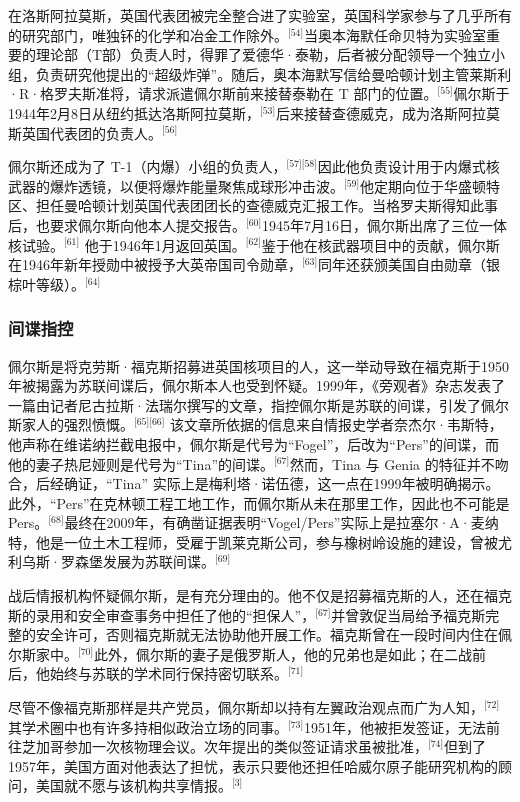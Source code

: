 在洛斯阿拉莫斯，英国代表团被完全整合进了实验室，英国科学家参与了几乎所有的研究部门，唯独钚的化学和冶金工作除外。\(^\text{[54]}\)当奥本海默任命贝特为实验室重要的理论部（T部）负责人时，得罪了爱德华·泰勒，后者被分配领导一个独立小组，负责研究他提出的“超级炸弹”。随后，奥本海默写信给曼哈顿计划主管莱斯利·R·格罗夫斯准将，请求派遣佩尔斯前来接替泰勒在 T 部门的位置。\(^\text{[55]}\)佩尔斯于1944年2月8日从纽约抵达洛斯阿拉莫斯，\(^\text{[53]}\)后来接替查德威克，成为洛斯阿拉莫斯英国代表团的负责人。\(^\text{[56]}\)

佩尔斯还成为了 T-1（内爆）小组的负责人，\(^\text{[57][58]}\)因此他负责设计用于内爆式核武器的爆炸透镜，以便将爆炸能量聚焦成球形冲击波。\(^\text{[59]}\)他定期向位于华盛顿特区、担任曼哈顿计划英国代表团团长的查德威克汇报工作。当格罗夫斯得知此事后，也要求佩尔斯向他本人提交报告。\(^\text{[60]}\)1945年7月16日，佩尔斯出席了三位一体核试验。\(^\text{[61]}\) 他于1946年1月返回英国。\(^\text{[62]}\)鉴于他在核武器项目中的贡献，佩尔斯在1946年新年授勋中被授予大英帝国司令勋章，\(^\text{[63]}\)同年还获颁美国自由勋章（银棕叶等级）。\(^\text{[64]}\)
\subsubsection{间谍指控}
佩尔斯是将克劳斯·福克斯招募进英国核项目的人，这一举动导致在福克斯于1950年被揭露为苏联间谍后，佩尔斯本人也受到怀疑。1999年，《旁观者》杂志发表了一篇由记者尼古拉斯·法瑞尔撰写的文章，指控佩尔斯是苏联的间谍，引发了佩尔斯家人的强烈愤慨。\(^\text{[65][66]}\) 该文章所依据的信息来自情报史学者奈杰尔·韦斯特，他声称在维诺纳拦截电报中，佩尔斯是代号为“Fogel”，后改为“Pers”的间谍，而他的妻子热尼娅则是代号为“Tina”的间谍。\(^\text{[67]}\)然而，Tina 与 Genia 的特征并不吻合，后经确证，“Tina” 实际上是梅利塔·诺伍德，这一点在1999年被明确揭示。此外，“Pers”在克林顿工程工地工作，而佩尔斯从未在那里工作，因此也不可能是 Pers。\(^\text{[68]}\)最终在2009年，有确凿证据表明“Vogel/Pers”实际上是拉塞尔·A·麦纳特，他是一位土木工程师，受雇于凯莱克斯公司，参与橡树岭设施的建设，曾被尤利乌斯·罗森堡发展为苏联间谍。\(^\text{[69]}\)

战后情报机构怀疑佩尔斯，是有充分理由的。他不仅是招募福克斯的人，还在福克斯的录用和安全审查事务中担任了他的“担保人”，\(^\text{[67]}\)并曾敦促当局给予福克斯完整的安全许可，否则福克斯就无法协助他开展工作。福克斯曾在一段时间内住在佩尔斯家中。\(^\text{[70]}\)此外，佩尔斯的妻子是俄罗斯人，他的兄弟也是如此；在二战前后，他始终与苏联的学术同行保持密切联系。\(^\text{[71]}\)

尽管不像福克斯那样是共产党员，佩尔斯却以持有左翼政治观点而广为人知，\(^\text{[72]}\)其学术圈中也有许多持相似政治立场的同事。\(^\text{[73]}\)1951年，他被拒发签证，无法前往芝加哥参加一次核物理会议。次年提出的类似签证请求虽被批准，\(^\text{[74]}\)但到了1957年，美国方面对他表达了担忧，表示只要他还担任哈威尔原子能研究机构的顾问，美国就不愿与该机构共享情报。\(^\text{[3]}\)
